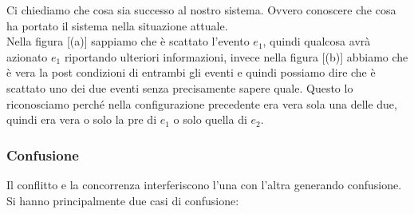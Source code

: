 Ci chiediamo che cosa sia successo al nostro sistema. Ovvero conoscere che cosa ha portato il sistema nella situazione attuale. \\

Nella figura [(a)] sappiamo che è scattato l'evento $e_1$, quindi qualcosa avrà azionato $e_1$ riportando ulteriori informazioni, invece nella figura [(b)] abbiamo che è vera la post condizioni di entrambi gli eventi e quindi possiamo dire che è scattato uno dei due eventi senza precisamente sapere quale. Questo lo riconosciamo perché nella configurazione precedente era vera sola una delle due, quindi era vera o solo la pre di $e_1$ o solo quella di $e_2$. 

\subsubsection{Confusione}
Il conflitto e la concorrenza interferiscono l'una con l'altra generando confusione. Si hanno principalmente due casi di confusione:
